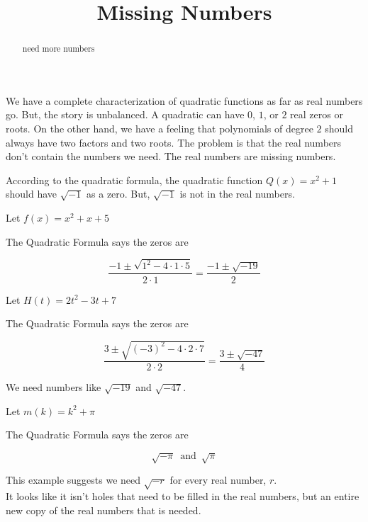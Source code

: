 \documentclass{ximera}
\title{Missing Numbers}
\begin{document}
\begin{abstract}
need more numbers
\end{abstract}
\maketitle




We have a complete characterization of quadratic functions as far as real numbers go.  But, the story is unbalanced.  A quadratic can have $0$, $1$, or $2$ real zeros or roots.  On the other hand, we have a feeling that polynomials of degree $2$ should always have two factors and two roots.  The problem is that the real numbers don't contain the numbers we need.  The real numbers are missing numbers.


According to the quadratic formula, the quadratic function $Q(x) = x^2 + 1$ should have $\sqrt{-1}$ as a zero.  But, $\sqrt{-1}$ is not in the real numbers. 




\begin{example}  
   
  
Let $f(x) = x^2 + x + 5$


The Quadratic Formula says the zeros are 


\[
\frac{-1 \pm \sqrt{1^2 - 4 \cdot 1 \cdot 5}}{2 \cdot 1} = \frac{-1 \pm \sqrt{-19}}{2}
\]


\end{example}






\begin{example}  
   
  
Let $H(t) = 2t^2 - 3t + 7$


The Quadratic Formula says the zeros are 


\[
\frac{3 \pm \sqrt{(-3)^2 - 4 \cdot 2 \cdot 7}}{2 \cdot 2} = \frac{3 \pm \sqrt{-47}}{4}
\]


\end{example}



We need numbers like $\sqrt{-19}$ and $\sqrt{-47}$. \\









\begin{example}  
   
  
Let $m(k) = k^2 + \pi $


The Quadratic Formula says the zeros are 


\[
\sqrt{-\pi} \, \text{ and } \, \sqrt{\pi}
\]


\end{example}




This example suggests we need $\sqrt{-r}$ for every real number, $r$. \\





It looks like it isn't holes that need to be filled in the real numbers, but an entire new copy of the real numbers that is needed.
\end{document}
